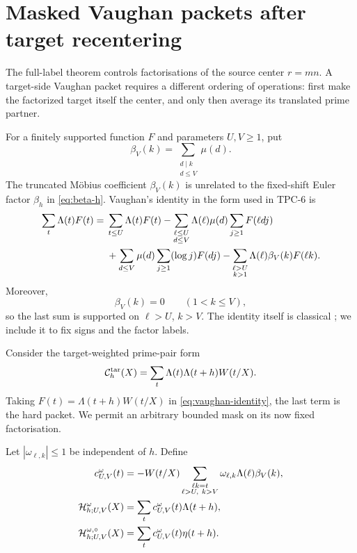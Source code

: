 \section{Masked Vaughan packets after target recentering}
\label{sec:masked-vaughan}

The full-label theorem controls factorisations of the source center
$r=mn$.  A target-side Vaughan packet requires a different ordering of
operations: first make the factorized target itself the center, and only
then average its translated prime partner.

For a finitely supported function $F$ and parameters $U,V\geq1$, put
\begin{equation}
 \beta_V(k)=\sum_{\substack{d\mid k\\d\leq V}}\mu(d).
 \label{eq:vaughan-beta}
\end{equation}
The truncated M\"obius coefficient $\beta_V(k)$ is unrelated to the
fixed-shift Euler factor $\beta_h$ in \eqref{eq:beta-h}.
Vaughan's identity in the form used in TPC-6 \citep{WangTPC6} is
\begin{align}
 \sum_t\Lambda(t)F(t)
={}&\sum_{t\leq U}\Lambda(t)F(t)
 -\sum_{\substack{\ell\leq U\\d\leq V}}
 \Lambda(\ell)\mu(d)\sum_{j\geq1}F(\ell dj)
 \notag\\
 &+\sum_{d\leq V}\mu(d)
 \sum_{j\geq1}(\log j)F(dj)
 -\sum_{\substack{\ell>U\\k>1}}
 \Lambda(\ell)\beta_V(k)F(\ell k).
 \label{eq:vaughan-identity}
\end{align}
Moreover,
\begin{equation}
 \beta_V(k)=0\qquad(1<k\leq V),
 \label{eq:vaughan-beta-vanishing}
\end{equation}
so the last sum is supported on $\ell>U$, $k>V$.  The identity itself is
classical \citep{Vaughan1977,HeathBrown1982}; we include it to fix signs and
the factor labels.

Consider the target-weighted prime-pair form
\begin{equation}
 \mathcal C_h^{\rm tar}(X)=
 \sum_t\Lambda(t)\Lambda(t+h)W(t/X).
 \label{eq:target-weighted-pair-form}
\end{equation}
Taking $F(t)=\Lambda(t+h)W(t/X)$ in
\eqref{eq:vaughan-identity}, the last term is the hard packet.  We permit an
arbitrary bounded mask on its now fixed factorisation.

\begin{definition}
\label{def:masked-hard-packet}
Let $|\omega_{\ell,k}|\leq1$ be independent of $h$.  Define
\begin{align}
 c_{U,V}^{\omega}(t)
 &=-W(t/X)
 \sum_{\substack{\ell k=t\\\ell>U,\ k>V}}
 \omega_{\ell,k}\Lambda(\ell)\beta_V(k),
 \label{eq:hard-packet-coefficient}\\
 \mathcal H_{h;U,V}^{\omega}(X)
 &=\sum_tc_{U,V}^{\omega}(t)\Lambda(t+h),
 \label{eq:raw-hard-packet}\\
 \mathcal H_{h;U,V}^{\omega,\circ}(X)
 &=\sum_tc_{U,V}^{\omega}(t)\eta(t+h).
 \label{eq:centered-hard-packet}
\end{align}
\end{definition}

